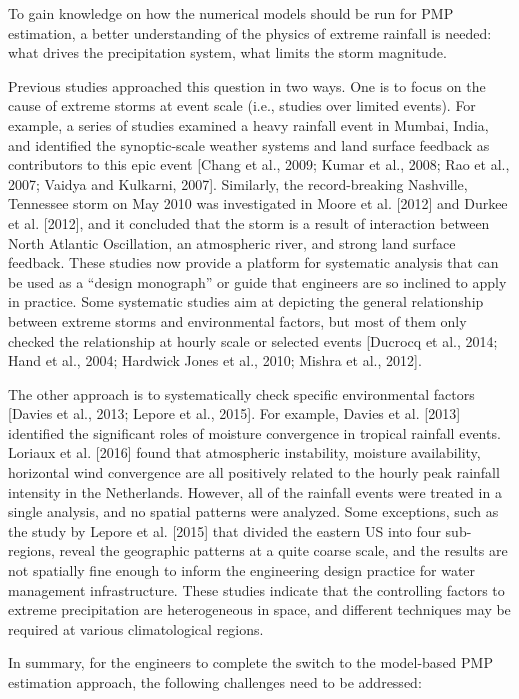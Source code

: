 To gain knowledge on how the numerical models should be run for PMP estimation, a better understanding of the physics of extreme rainfall is needed: what drives the precipitation system, what limits the storm magnitude.

Previous studies approached this question in two ways. One is to focus on the cause of extreme storms at event scale (i.e., studies over limited events). For example, a series of studies examined a heavy rainfall event in Mumbai, India, and identified the synoptic-scale weather systems and land surface feedback as contributors to this epic event [Chang et al., 2009; Kumar et al., 2008; Rao et al., 2007; Vaidya and Kulkarni, 2007]. Similarly, the record-breaking Nashville, Tennessee storm on May 2010 was investigated in Moore et al. [2012] and Durkee et al. [2012], and it concluded that the storm is a result of interaction between North Atlantic Oscillation, an atmospheric river, and strong land surface feedback. These studies now provide a platform for systematic analysis that can be used as a ``design monograph'' or guide that engineers are so inclined to apply in practice. Some systematic studies aim at depicting the general relationship between extreme storms and environmental factors, but most of them only checked the relationship at hourly scale or selected events [Ducrocq et al., 2014; Hand et al., 2004; Hardwick Jones et al., 2010; Mishra et al., 2012].

The other approach is to systematically check specific environmental factors [Davies et al., 2013; Lepore et al., 2015]. For example, Davies et al. [2013] identified the significant roles of moisture convergence in tropical rainfall events. Loriaux et al. [2016] found that atmospheric instability, moisture availability, horizontal wind convergence are all positively related to the hourly peak rainfall intensity in the Netherlands. However, all of the rainfall events were treated in a single analysis, and no spatial patterns were analyzed. Some exceptions, such as the study by Lepore et al. [2015] that divided the eastern US into four sub-regions, reveal the geographic patterns at a quite coarse scale, and the results are not spatially fine enough to inform the engineering design practice for water management infrastructure. These studies indicate that the controlling factors to extreme precipitation are heterogeneous in space, and different techniques may be required at various climatological regions.

\vskip 0.4in
In summary, for the engineers to complete the switch to the model-based PMP estimation approach, the following challenges need to be addressed:

